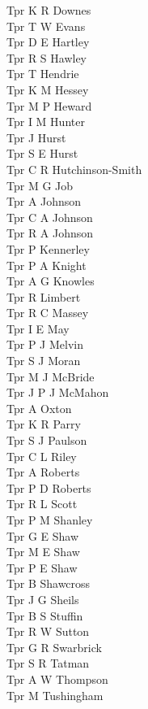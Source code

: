 \begin{multicols}{2}
  Tpr K R Downes \\
  Tpr T W Evans \\
  Tpr D E Hartley \\
  Tpr R S Hawley \\
  Tpr T Hendrie \\
  Tpr K M Hessey \\
  Tpr M P Heward \\
  Tpr I M Hunter \\
  Tpr J Hurst \\
  Tpr S E Hurst \\
  Tpr C R Hutchinson-Smith \\
  Tpr M G Job \\
  Tpr A Johnson \\
  Tpr C A Johnson \\
  Tpr R A Johnson \\
  Tpr P Kennerley \\
  Tpr P A Knight \\
  Tpr A G Knowles \\
  Tpr R Limbert \\
  Tpr R C Massey \\
  Tpr I E May \\
  Tpr P J Melvin \\
  Tpr S J Moran \\
  Tpr M J McBride \\
  Tpr J P J McMahon \\
  Tpr A Oxton \\
  Tpr K R Parry \\
  Tpr S J Paulson \\
  Tpr C L Riley \\
  Tpr A Roberts \\
  Tpr P D Roberts \\
  Tpr R L Scott \\
  Tpr P M Shanley \\
  Tpr G E Shaw \\
  Tpr M E Shaw \\
  Tpr P E Shaw \\
  Tpr B Shawcross \\
  Tpr J G Sheils \\
  Tpr B S Stuffin \\
  Tpr R W Sutton \\
  Tpr G R Swarbrick \\
  Tpr S R Tatman \\
  Tpr A W Thompson \\
  Tpr M Tushingham \\

\end{multicols}

